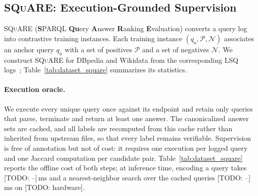 \documentclass[runningheads]{llncs}
\newcommand{\squareds}{\textsc{SQuARE}}
\newcommand{\hp}[1]{{\color{red!75!black}#1}}
\begin{document}
\subsection{\squareds{}: Execution-Grounded Supervision}
\label{sec:data}

\squareds{} (\textbf{S}PARQL \textbf{Qu}ery \textbf{A}nswer \textbf{R}anking
\textbf{E}valuation) converts a query log into contrastive training instances.
Each training instance $(q_a,\mathcal{P},\mathcal{N})$ associates an anchor query $q_a$
with a set of positives $\mathcal{P}$ and a set of negatives $\mathcal{N}$.
We construct \squareds{} for DBpedia and Wikidata from the corresponding LSQ
logs~\cite{saleem2015lsq}; Table~\ref{tab:dataset_square} summarizes its
statistics.

\paragraph{Execution oracle.}
We execute every unique query once against its endpoint and retain only
queries that parse, terminate and return at least one answer. The
canonicalized answer sets are cached, and all labels are recomputed from this
cache rather than inherited from upstream files, so that every label remains
verifiable. Supervision is free of annotation but not of cost: it requires one
execution per logged query and one Jaccard computation per candidate pair.
Table~\ref{tab:dataset_square} reports the offline cost of both steps; at
inference time, encoding a query takes \hp{[TODO: --]}\,ms and a
nearest-neighbor search over the cached queries \hp{[TODO: --]}\,ms on
\hp{[TODO: hardware]}.
\end{document}
